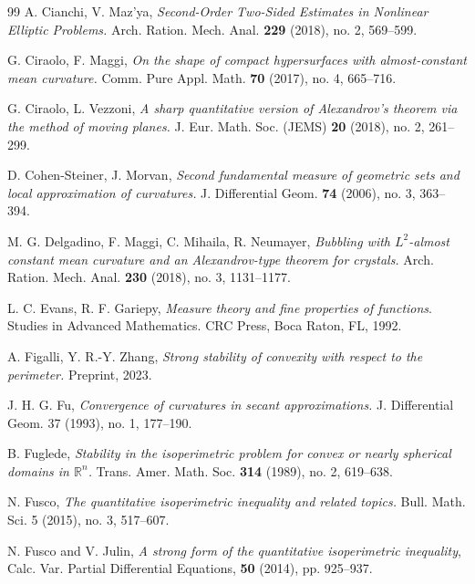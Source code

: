 \documentclass[reqno,11pt]{amsart}
\numberwithin{equation}{section}
\theoremstyle{remark}
\begin{document}
\begin{thebibliography}{99}
A. Cianchi, V. Maz'ya,
\emph{Second-Order Two-Sided Estimates in Nonlinear Elliptic Problems.}
Arch. Ration. Mech. Anal. \textbf{229} (2018), no. 2, 569--599.

 
G. Ciraolo,  F. Maggi, {\it On the shape of compact hypersurfaces with almost-constant mean curvature.} Comm. Pure Appl. Math. \textbf{70} (2017), no. 4, 665--716.


G. Ciraolo,  L. Vezzoni, 
 {\it A sharp quantitative version of Alexandrov's theorem via the method of moving planes. } 
J. Eur. Math. Soc. (JEMS)  \textbf{20} (2018), no. 2, 261--299.

D. Cohen-Steiner, J.  Morvan, 
 {\it Second fundamental measure of geometric sets and local approximation of curvatures. }
J. Differential Geom. \textbf{74} (2006), no. 3, 363--394.



M. G. Delgadino, F. Maggi, C. Mihaila, R. Neumayer, {\it Bubbling with $L^2$-almost constant mean curvature and an Alexandrov-type theorem for crystals.} Arch. Ration. Mech. Anal. \textbf{230} (2018), no. 3, 1131--1177.


L. C. Evans,  R. F. Gariepy, \emph{Measure theory and fine properties of functions}. Studies in Advanced Mathematics. CRC Press, Boca Raton, FL, 1992.  

A. Figalli,  Y. R.-Y.  Zhang,
\emph{Strong stability of convexity with respect to the perimeter. }
Preprint, 2023.

J. H. G. Fu, \emph{Convergence of curvatures in secant approximations.}
J. Differential Geom. 37 (1993), no. 1, 177--190.


B. Fuglede, {\it Stability in the isoperimetric problem for convex or nearly spherical domains in $\mathbb R^n$.} Trans. Amer. Math. Soc. {\bf 314} (1989), no. 2, 619--638.

N. Fusco, \emph{The quantitative isoperimetric inequality and related topics.}
Bull. Math. Sci. 5 (2015), no. 3, 517--607.



N. Fusco and V. Julin, \emph{A strong form of the quantitative isoperimetric inequality}, Calc. Var. Partial Differential Equations, \textbf{50} (2014), pp. 925--937. 


\end{thebibliography}
\end{document}
